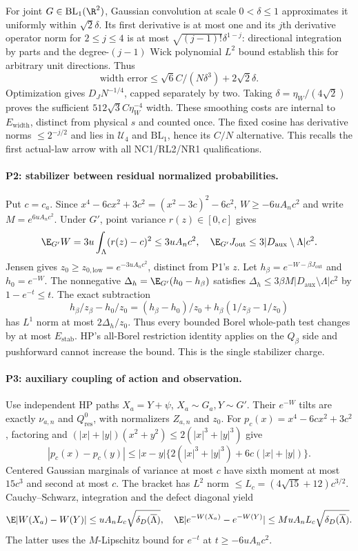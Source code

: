 For joint $G\in\mathrm{BL}_1(\R^2)$, Gaussian convolution at scale
$0<\delta\le1$ approximates it uniformly within $\sqrt2\delta$.
Its first derivative is at most one and its $j$th derivative operator
norm for $2\le j\le4$ is at most $\sqrt{(j-1)!}\delta^{1-j}$:
directional integration by parts and the degree-$(j-1)$ Wick polynomial
$L^2$ bound establish this for arbitrary unit directions. Thus
\[
 \text{width error}\le\sqrt6 C/(N\delta^3)+2\sqrt2\delta .
\]
Optimization gives $D_JN^{-1/4}$, capped separately by two.
Taking $\delta=\eta_W/(4\sqrt2)$ proves the sufficient
$512\sqrt3 C\eta_W^{-4}$ width. These smoothing costs are internal to
$E_{\mathrm{width}}$, distinct from physical $s$ and counted once.
The fixed cosine has derivative norms $\le2^{-j/2}$ and lies in
$\mathcal U_4$ and $\mathrm{BL}_1$, hence its $C/N$ alternative.
This recalls the first actual-law arrow with all NC1/RL2/NR1 qualifications.

\paragraph{P2: stabilizer between residual normalized probabilities.}
Put $c=c_a$. Since $x^4-6cx^2+3c^2=(x^2-3c)^2-6c^2$,
$W\ge-6uA_nc^2$ and write $M=e^{6uA_nc^2}$.
Under $G'$, point variance $r(z)\in[0,c]$ gives
\[
 \E_{G'}W=3u\int_\Lambda(r(z)-c)^2\le3uA_nc^2,\quad
 \E_{G'}J_{\mathrm{out}}\le3|D_{\mathrm{aux}}\setminus\Lambda|c^2.
\]
Jensen gives $z_0\ge z_{0,\mathrm{low}}=e^{-3uA_nc^2}$, distinct from P1's
$z$. Let $h_\beta=e^{-W-\beta J_{\mathrm{out}}}$ and $h_0=e^{-W}$.
The nonnegative $\Delta_h=\E_{G'}(h_0-h_\beta)$ satisfies
$\Delta_h\le3\beta M|D_{\mathrm{aux}}\setminus\Lambda|c^2$ by
$1-e^{-t}\le t$. The exact subtraction
\[
 h_\beta/z_\beta-h_0/z_0
 =(h_\beta-h_0)/z_0+h_\beta(1/z_\beta-1/z_0)
\]
has $L^1$ norm at most $2\Delta_h/z_0$. Thus every bounded Borel whole-path
test changes by at most $E_{\mathrm{stab}}$. HP's all-Borel restriction
identity applies on the $Q_\beta$ side and pushforward cannot increase
the bound. This is the single stabilizer charge.

\paragraph{P3: auxiliary coupling of action and observation.}
Use independent HP paths $X_a=Y+\psi$, $X_a\sim G_a,Y\sim G'$.
Their $e^{-W}$ tilts are exactly $\nu_{a,n}$ and $Q_{\mathrm{res}}^0$,
with normalizers $Z_{a,n}$ and $z_0$. For $p_c(x)=x^4-6cx^2+3c^2$,
factoring and $(|x|+|y|)(x^2+y^2)\le2(|x|^3+|y|^3)$ give
\[
 |p_c(x)-p_c(y)|
 \le|x-y|\{2(|x|^3+|y|^3)+6c(|x|+|y|)\}.
\]
Centered Gaussian marginals of variance at most $c$ have sixth moment
at most $15c^3$ and second at most $c$. The bracket has $L^2$ norm
$\le L_c=(4\sqrt{15}+12)c^{3/2}$. Cauchy--Schwarz, integration and the
defect diagonal yield
\[
 \E|W(X_a)-W(Y)|\le uA_nL_c\sqrt{\delta_D(\overline\Lambda)},\quad
 \E|e^{-W(X_a)}-e^{-W(Y)}|
 \le M uA_nL_c\sqrt{\delta_D(\overline\Lambda)}.
\]
The latter uses the $M$-Lipschitz bound for $e^{-t}$ at $t\ge-6uA_nc^2$.

